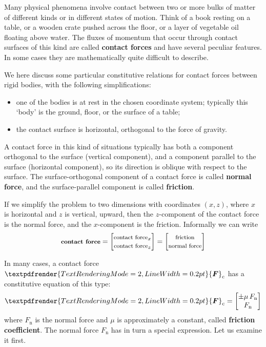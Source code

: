 \documentclass[a4paper,12pt,%
onecolumn,oneside,%
british%
]{memoir}
\renewcommand*{\bm}[1]{\textpdfrender{TextRenderingMode=2,LineWidth=0.2pt}{\boldsymbol{#1}}}
\renewcommand*{\|}[1][]{\nonscript\:#1\vert\nonscript\:\mathopen{}}
\newcommand*{\yfri}{\mu} %
\newcommand*{\yF}{\bm{F}}
\newcommand*{\yFc}{\yF_{\text{c}}}
\newcommand*{\yFn}{F_{\text{n}}}
\begin{document}
Many physical phenomena involve contact between two or more bulks of matter of different kinds or in different states of motion. Think of a book resting on a table, or a wooden crate pushed across the floor, or a layer of vegetable oil floating above water. The fluxes of momentum that occur through contact surfaces of this kind are called \textbf{contact forces} and have several peculiar features. In some cases they are mathematically quite difficult to describe.

We here discuss some particular constitutive relations for contact forces between rigid bodies, with the following simplifications:
\begin{itemize}[nosep]
\item one of the bodies is at rest in the chosen coordinate system; typically this \enquote*{body} is the ground, floor, or the surface of a table;
\item the contact surface is horizontal, orthogonal to the force of gravity.
\end{itemize}

A contact force in this kind of situations typically has both a component orthogonal to the surface (vertical component), and a component parallel to the surface (horizontal component), so its direction is oblique with respect to the surface. The surface-orthogonal component of a contact force is called \textbf{normal force}, and the surface-parallel component is called \textbf{friction}.

If we simplify the problem to two dimensions with coordinates $(x,z)$, where $x$ is horizontal and $z$ is vertical, upward, then the $z$-component of the contact force is the normal force, and the $x$-component is the friction. Informally we can write
\begin{equation*}
  \textbf{\footnotesize contact force}
  =
  \begin{bmatrix}
    \text{\footnotesize contact force}_{x}
    \\
    \text{\footnotesize contact force}_{z}
  \end{bmatrix}
  =
  \begin{bmatrix}
    \text{\footnotesize friction}
    \\
    \text{\footnotesize normal force}
  \end{bmatrix}
\end{equation*}

In many cases, a contact force $\yFc$ has a constitutive equation of this type:
\begin{equation}\label{eq:contact_force_2D}
  \yFc =
  \begin{bmatrix}
    \pm\yfri\, \yFn \\
    \yFn
  \end{bmatrix}
\end{equation}
where $\yFn$ is the normal force and $\yfri$ is approximately a constant, called \textbf{friction coefficient}. The normal force $\yFn$ has in turn a special expression. Let us examine it first.
\end{document}
